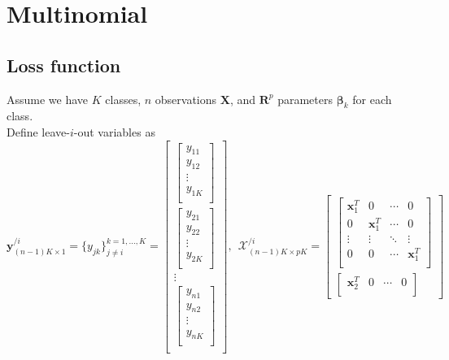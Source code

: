 \documentclass[letter]{article}
\begin{document}
	\section{Multinomial}
	\subsection{Loss function}
	
	Assume we have $K$ classes, $n$ observations $\bm{X}$, and $\bm{R}^p$ parameters $\bm{\beta}_{k}$ for each class. 
	\\
	
	Define leave-$i$-out variables as 
	$$\bm{y}_{(n-1)K\times 1}^{/i}=\{y_{jk}\}_{j\neq i}^{k=1,...,K}=
	\begin{bmatrix}
	\begin{bmatrix}
	y_{11} \\
	y_{12} \\
	\vdots \\
	y_{1K} \\
	\end{bmatrix} \\
	\begin{bmatrix}
	y_{21} \\
	y_{22} \\
	\vdots \\
	y_{2K} \\
	\end{bmatrix} \\
	\vdots \\
	\begin{bmatrix}
	y_{n1} \\
	y_{n2} \\
	\vdots \\
	y_{nK} \\
	\end{bmatrix} \\
	\end{bmatrix},\ \ 
	\bm{\mathcal{X}}_{(n-1)K\times pK}^{/i}=\begin{bmatrix}
	\begin{bmatrix}
	\bm{x}_1^T & 0 & \cdots & 0 \\
	0 & \bm{x}_1^T & \cdots & 0 \\
	\vdots & \vdots & \ddots & \vdots \\
	0 & 0 & \cdots & \bm{x}_1^T \\
	\end{bmatrix} \\
	\begin{bmatrix}
	\bm{x}_2^T & 0 & \cdots & 0 \\

\end{bmatrix}
\end{bmatrix}$$
\end{document}
